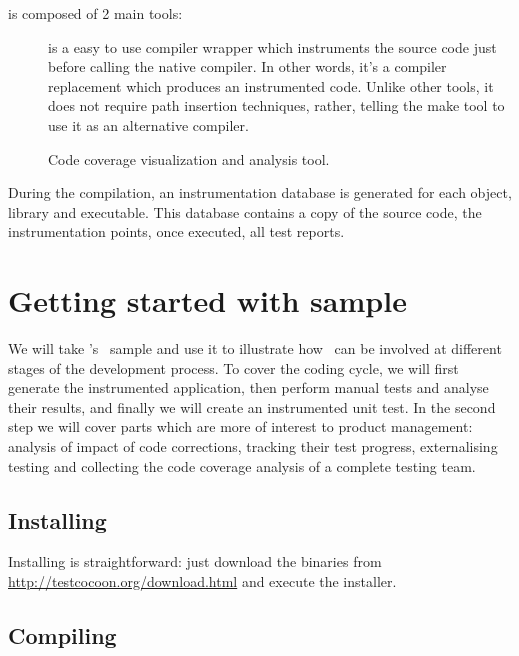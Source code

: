 {\TestCocoon} is composed of 2 main tools:
\begin{description}
  \item[{\CoverageScanner}] {\CoverageScanner} is a easy to use compiler wrapper which
    instruments the source code just before calling the native compiler. In
    other words, it's a compiler replacement which produces an instrumented
   code. Unlike other tools, it does not require path insertion techniques,
   rather, telling the make tool to use it as an alternative compiler.
  \item[{\CoverageBrowser}] Code coverage visualization and analysis tool.
\end{description}

During the compilation, an instrumentation database is generated for each
object, library and executable. This database contains  a copy of the source
code, the instrumentation points, once executed, all test reports.

\section{Getting started with {\Qt} {\TextEdit} sample}

We will take \Qt's \TextEdit\ sample and use it to illustrate how \TestCocoon\ can be
involved at different stages of the development process.
To cover the coding cycle, we will first generate the instrumented application,
then perform manual tests and analyse their results, and finally we will create an
instrumented unit test.
In the second step we will  cover parts which are more of interest to product
management: analysis of impact of code corrections, tracking their test
progress, externalising testing and collecting the code coverage analysis of a
complete testing team.


\subsection{Installing {\TestCocoon}}

Installing {\TestCocoon} is straightforward: just download the binaries  from
\url{http://testcocoon.org/download.html} and execute the installer.

\subsection{Compiling {\TextEdit}}


